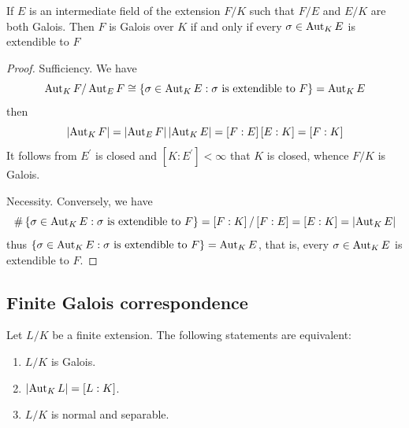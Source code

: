 \begin{proposition}
    If $E$ is an intermediate field of the extension $F/K$ such that $F/E$ and $E/K$ are both Galois.
    Then $F$ is Galois over $K$ if and only if every $\sigma \in  \operatorname{\operatorname{Aut}}_K E$ is extendible to $F$
    \begin{proof}
        Sufficiency.
        We have
        \begin{equation*}
            \operatorname{\operatorname{Aut}}_K F / \operatorname{\operatorname{Aut}}_E F
            \cong
            \left\{\sigma \in \operatorname{\operatorname{Aut}}_K E : \sigma \text{ is extendible to } F \right\}
            =
            \operatorname{\operatorname{Aut}}_K E
        \end{equation*}
        then
        \begin{equation*}
            \left|\operatorname{\operatorname{Aut}}_K F\right|
            =
            \left|\operatorname{\operatorname{Aut}}_E F\right| \left|\operatorname{\operatorname{Aut}}_K E \right|
            =
            \left[F:E\right] \left[E:K\right]
            =
            \left[F:K\right]
        \end{equation*}
        It follows from
        $E^\prime$ is closed and $\left[K:E^\prime\right]< \infty$ that $K$ is closed, whence $F/K$ is Galois.

        Necessity. Conversely, we have
        \begin{equation*}
            \# \left\{\sigma \in \operatorname{\operatorname{Aut}}_K E : \sigma \text{ is extendible to } F \right\}
            =
            \left[F:K\right]/\left[F:E\right]
            =
            \left[E:K\right]
            =
            \left|\operatorname{\operatorname{Aut}}_K E\right|
        \end{equation*}
        thus $\left\{\sigma \in \operatorname{\operatorname{Aut}}_K E : \sigma \text{ is extendible to } F \right\}=\operatorname{\operatorname{Aut}}_K E$, that is, every $\sigma \in  \operatorname{\operatorname{Aut}}_K E$ is extendible to $F$.
    \end{proof}
\end{proposition}

\subsection{Finite Galois correspondence}

\begin{theorem}
    Let $L/K$ be a finite extension.
    The following statements are equivalent:
    \begin{enumerate}
        \item
              $L/K$ is Galois.
        \item
              $\left|\operatorname{\operatorname{Aut}}_K L\right| = [L:K]$.
        \item
              $L/K$ is normal and separable.
    \end{enumerate}
\end{theorem}




